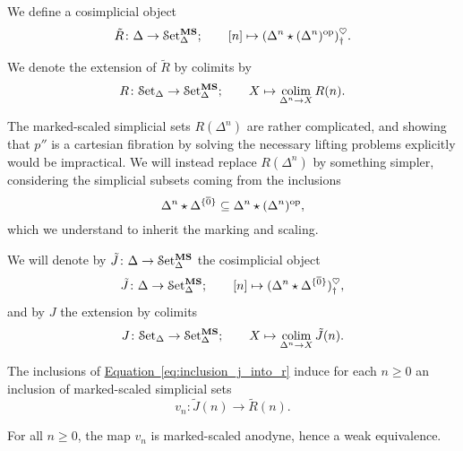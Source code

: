 \documentclass[main.tex]{subfiles}
\begin{document}
\begin{definition}
  We define a cosimplicial object
  \begin{equation*}
    \tilde{R}\colon \Delta \to \mathcal{S}\mathrm{et}_{\Delta}^{\mathbf{MS}};\qquad [n] \mapsto (\Delta^{n} \star (\Delta^{n})^{\mathrm{op}})^{\heartsuit}_{\dagger}.
  \end{equation*}

  We denote the extension of $\tilde{R}$ by colimits by
  \begin{equation*}
    R\colon \mathcal{S}\mathrm{et}_{\Delta} \to \mathcal{S}\mathrm{et}_{\Delta}^{\mathbf{MS}};\qquad X \mapsto \operatorname*{colim}_{\Delta^{n} \to X} R(n).
  \end{equation*}
\end{definition}

The marked-scaled simplicial sets $R(\Delta^{n})$ are rather complicated, and showing that $p''$ is a cartesian fibration by solving the necessary lifting problems explicitly would be impractical. We will instead replace $R(\Delta^{n})$ by something simpler, considering the simplicial subsets coming from the inclusions
\begin{equation}
  \label{eq:inclusion_j_into_r}
  \Delta^{n} \star \Delta^{\{\overline{0}\}} \subseteq \Delta^{n} \star (\Delta^{n})^{\mathrm{op}},
\end{equation}
which we understand to inherit the marking and scaling.

\begin{definition}
  We will denote by $\tilde{J}\colon \Delta \to \mathcal{S}\mathrm{et}_{\Delta}^{\mathbf{MS}}$ the cosimplicial object
  \begin{equation*}
    \tilde{J}\colon \Delta \to \mathcal{S}\mathrm{et}_{\Delta}^{\mathbf{MS}};\qquad [n] \mapsto (\Delta^{n} \star \Delta^{\{\overline{0}\}})^{\heartsuit}_{\dagger},
  \end{equation*}
  and by $J$ the extension by colimits
  \begin{equation*}
    J\colon \mathcal{S}\mathrm{et}_{\Delta} \to \mathcal{S}\mathrm{et}_{\Delta}^{\mathbf{MS}};\qquad X \mapsto \operatorname*{colim}_{\Delta^{n} \to X} \tilde{J}(n).
  \end{equation*}
\end{definition}

The inclusions of \hyperref[eq:inclusion_j_into_r]{Equation~\ref*{eq:inclusion_j_into_r}} induce for each $n \geq 0$ an inclusion of marked-scaled simplicial sets
\begin{equation*}
  v_{n}\colon \tilde{J}(n) \to \tilde{R}(n).
\end{equation*}

\begin{lemma}
  \label{lemma:lower_morphism_equivalence}
  For all $n \geq 0$, the map $v_{n}$ is marked-scaled anodyne, hence a weak equivalence.
\end{lemma}
\end{document}
